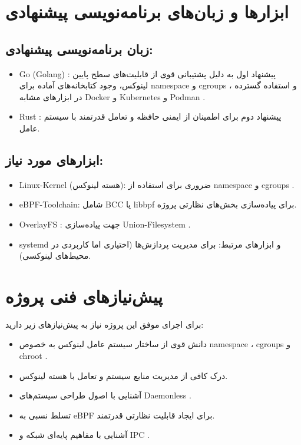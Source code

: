 \documentclass[10pt,a4paper]{article}
\begin{document}
\section{ابزارها و زبان‌های برنامه‌نویسی پیشنهادی}


\subsection{زبان برنامه‌نویسی پیشنهادی:}

\begin{itemize}
	\item
	 Go (Golang) :
	  پیشنهاد اول به دلیل پشتیبانی قوی از قابلیت‌های سطح پایین لینوکس، وجود کتابخانه‌های آماده برای namespace و cgroups ، و استفاده گسترده در ابزارهای مشابه Docker و Kubernetes و Podman .
	
	\item 
	Rust :
	 پیشنهاد دوم برای اطمینان از ایمنی حافظه و تعامل قدرتمند با سیستم عامل.
\end{itemize}

\subsection{ابزارهای مورد نیاز:}

\begin{itemize}
	\item 
	Linux-Kernel (هسته لینوکس): ضروری برای استفاده از namespace و cgroups .
	
	\item 
	eBPF-Toolchain: شامل BCC یا libbpf برای پیاده‌سازی بخش‌های نظارتی پروژه.
	
	\item 
	OverlayFS : جهت پیاده‌سازی Union-Filesystem .
	
	\item 
	systemd و ابزارهای مرتبط: برای مدیریت پردازش‌ها (اختیاری اما کاربردی در محیط‌های لینوکسی).
\end{itemize}


\section{پیش‌نیازهای فنی پروژه}
برای اجرای موفق این پروژه نیاز به پیش‌نیازهای زیر دارید:
\begin{itemize}
	\item
	 دانش قوی از ساختار سیستم عامل لینوکس به خصوص namespace ، cgroups و chroot .
	\item
	 درک کافی از مدیریت منابع سیستم و تعامل با هسته لینوکس.
	\item
	 آشنایی با اصول طراحی سیستم‌های Daemonless .
	\item
	 تسلط نسبی به eBPF برای ایجاد قابلیت نظارتی قدرتمند.
	\item
	 آشنایی با مفاهیم پایه‌ای شبکه و IPC .
\end{itemize}
\end{document}
